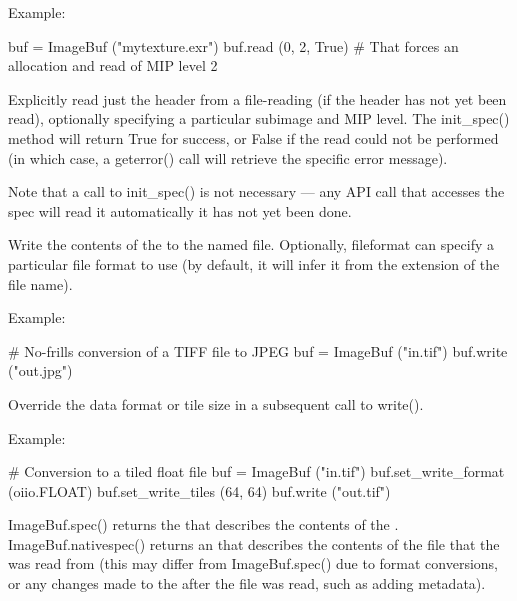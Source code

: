 \noindent Example:
\begin{code}
    buf = ImageBuf ("mytexture.exr")
    buf.read (0, 2, True)
    # That forces an allocation and read of MIP level 2
\end{code}
\apiend


Explicitly read just the header from a file-reading \ImageBuf (if the header
has not yet been read), optionally specifying a particular subimage and MIP
level. The {\cf init_spec()} method will return {\cf True} for success, or
{\cf False} if the read could not be performed (in which case, a {\cf
geterror()} call will retrieve the specific error message).

Note that a call to {\cf init_spec()} is not necessary --- any \ImageBuf API
call that accesses the spec will read it automatically it has not yet been
done.
\apiend

Write the contents of the \ImageBuf to the named file.  Optionally, {\cf
fileformat} can specify a particular file format to use (by default, it
will infer it from the extension of the file name).

\noindent Example:
\begin{code}
    # No-frills conversion of a TIFF file to JPEG
    buf = ImageBuf ("in.tif")
    buf.write ("out.jpg")
\end{code}
\apiend

Override the data format or tile size in a subsequent call to {\cf write()}.

\noindent Example:
\begin{code}
    # Conversion to a tiled float file
    buf = ImageBuf ("in.tif")
    buf.set_write_format (oiio.FLOAT)
    buf.set_write_tiles (64, 64)
    buf.write ("out.tif")
\end{code}
\apiend

{\cf ImageBuf.spec()} returns the \ImageSpec that describes the contents of
the \ImageBuf.  {\cf ImageBuf.nativespec()} returns an \ImageSpec that
describes the contents of the file that the \ImageBuf was read from (this
may differ from {\cf ImageBuf.spec()} due to format conversions, or any
changes made to the \ImageBuf after the file was read, such as adding
metadata).

